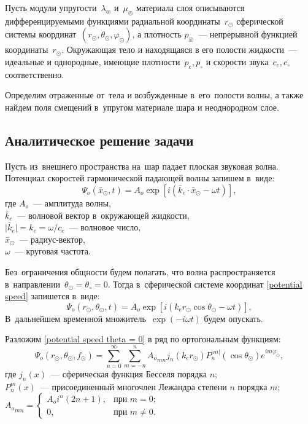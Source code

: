 Пусть модули упругости~$\lambda_\circledcirc$ и~$\mu_\circledcirc$ материала слоя описываются дифференцируемыми функциями радиальной координаты~$r_\odot$ сферической системы координат~$(r_\odot, \theta_\odot, \varphi_\odot)$, а плотность $p_\circledcirc$~--- непрерывной функцией координаты~$r_\odot$.  Окружающая тело и находящаяся в его полости жидкости~--- идеальные и однородные, имеющие плотности~$p_e, p_\circ$ и скорости звука~$c_e, c_\circ$ соответственно. 

Определим отраженные от~тела и возбужденные в~его~полости волны, а также найдем поля смещений в~упругом материале шара и неоднородном слое.


\newpage
\subsection{Аналитическое решение задачи}

Пусть из~внешнего пространства на~шар падает плоская звуковая волна. Потенциал скоростей гармонической падающей волны запишем в~виде:
\begin{equation}\label{potential speed}
\Psi_o(\bar{x}_\odot, t) = A_o \exp\left[i\left(\bar{k}_e\!\cdot\!\bar{x}_\odot-\omega t\right)\right],
\end{equation}
где $A_o$~--- амплитуда волны, \\
$\bar{k}_e$~--- волновой вектор в~окружающей жидкости,  \\
$\lvert\bar{k}_e\rvert = k_e = \omega / c_e$~--- волновое число, \\
$\bar{x}_\odot$~--- радиус-вектор, \\
$\omega$~--- круговая частота.

 Без~ограничения общности будем полагать, что волна распространяется в~направлении~$\theta_\odot = \theta_\circ = 0$. Тогда в~сферической системе координат \eqref{potential speed} запишется в~виде:
\begin{equation}\label{potential speed theta = 0}
\Psi_o(r_\odot, \theta_\odot, t) = A_o \exp\left[i\left(k_e r_\odot\cos\theta_\odot - \omega t\right)\right],
\end{equation}
В~дальнейшем временной множитель~$\exp(-i\omega t)$ будем опускать.

Разложим \eqref{potential speed theta = 0} в ряд по ортогональным функциям:
\begin{equation}
\Psi_o(r_\odot, \theta_\odot, f_\odot) = \sum\limits_{n=0}^\infty\sum\limits_{m=-n}^n {A_o}_{mn}j_n(k_e r_\odot)P_n^{\lvert m\rvert}(\cos\theta_\odot) e^{im\varphi_\odot},
\end{equation}
где $j_n(x)$~--- сферическая функция Бесселя порядка $n;$\\
$P_n^m(x)$~--- присоединенный многочлен Лежандра степени $n$ порядка $m;$\\
${A_o}_{mn} = 
\begin{cases}
A_o i^n(2n+1),& \text{при } m=0;\\
0,& \text{при } m \ne 0.
\end{cases}
$

